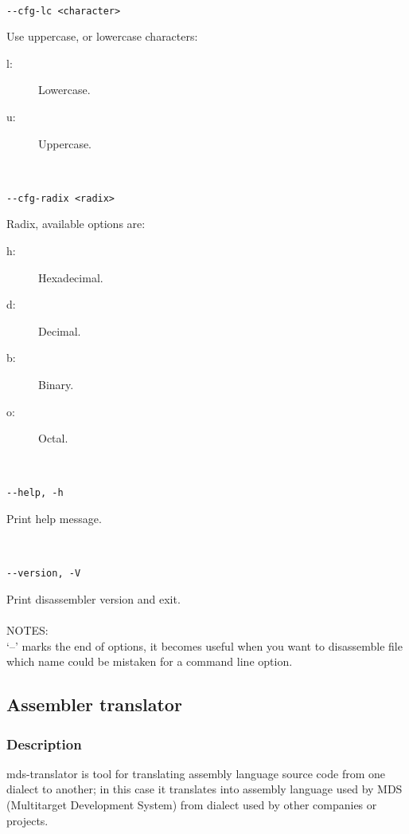                 {
                ~\\
                \usecodefont

                \verb'--cfg-lc <character>'\\
                }
                Use uppercase, or lowercase characters:
                \begin{description}
                    \item [l:] Lowercase.
                    \item [u:] Uppercase.
                \end{description}
                {
                ~\\
                \usecodefont

                \verb'--cfg-radix <radix>'\\
                }
                Radix, available options are:
                \begin{description}
                    \item [h:] Hexadecimal.
                    \item [d:] Decimal.
                    \item [b:] Binary.
                    \item [o:] Octal.
                \end{description}
                                {
                ~\\
                \usecodefont

                \verb'--help, -h'\\
                }
                Print help message.
                {
                ~\\
                \usecodefont

                \verb'--version, -V'\\
                }
                Print disassembler version and exit.\\\\
                NOTES:\\
                `--' marks the end of options, it becomes useful when you want to disassemble file which name could be mistaken for a command line option.
    \subsection{Assembler translator}
        \subsubsection{Description}
            mds-translator is tool for translating assembly language source code from one dialect to another; in this case it translates
            into assembly language used by MDS (Multitarget Development System) from dialect used by other companies or projects.\\

